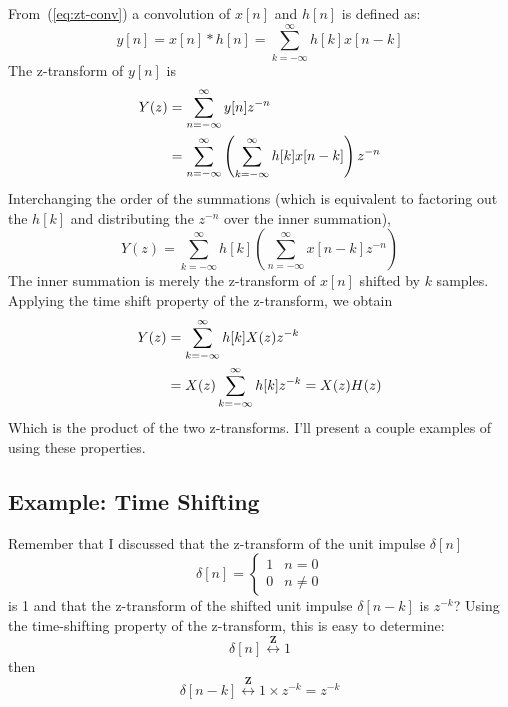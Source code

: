 From~(\ref{eq:zt-conv}) a convolution of $x[n]$ and $h[n]$ is defined as:
\begin{equation}
y[n] = x[n] \ast h[n] = \sum_{k=-\infty}^{\infty} h[k] x[n-k]
\end{equation}
The z-transform of $y[n]$ is 
\begin{align}
Y(z) &= \sum_{n=-\infty}^{\infty} y[n]z^{-n} \notag\\
     &= \sum_{n=-\infty}^{\infty}
     \left( \sum_{k=-\infty}^{\infty} h[k] x[n-k] \right)z^{-n}
\end{align}
Interchanging the order of the summations (which is equivalent to
factoring out the $h[k]$ and distributing the $z^{-n}$ over the inner
summation),
\begin{equation}
Y(z) = \sum_{k=-\infty}^{\infty} h[k]
             \left( \sum_{n=-\infty}^{\infty} x[n-k] z^{-n} \right)
\end{equation}
The inner summation is merely the z-transform of $x[n]$ shifted by $k$
samples.  Applying the time shift property of the z-transform, we
obtain
\begin{align}
Y(z) &= \sum_{k=-\infty}^{\infty} h[k] X(z) z^{-k} \notag\\
     &= X(z)\sum_{k=-\infty}^{\infty} h[k] z^{-k} 
     = X(z) H(z)
\end{align}
Which is the product of the two z-transforms. I'll present a couple
examples of using these properties.

\subsection{Example: Time Shifting}

Remember that I discussed that the z-transform of the unit impulse
$\delta[n]$
\begin{equation}
\delta[n] = \left\{\begin{array}{ll}
                        1 & n=0 \\
                        0 & n \neq 0
          \end{array}\right.
\end{equation}
is 1 and that the z-transform of the shifted unit impulse
$\delta[n-k]$ is $z^{-k}$? Using the time-shifting property of the
z-transform, this is easy to determine:
\begin{equation}
\delta[n]\stackrel{\mathbf{Z}}{\longleftrightarrow} 1
\end{equation}
then 
\begin{equation}
\delta[n-k]\stackrel{\mathbf{Z}}{\longleftrightarrow} 1 \times z^{-k}=z^{-k}
\end{equation}

